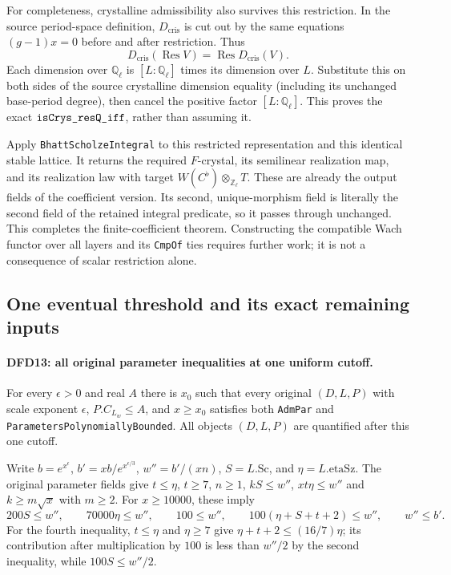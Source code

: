 \documentclass[11pt,a4paper]{article}
\numberwithin{equation}{section}
\theoremstyle{remark}\newtheorem{remark}[theorem]{Remark}
\begin{document}
For completeness, crystalline admissibility also survives
this restriction. In the source period-space definition,
$D_{\mathrm{cris}}$ is cut out by the same equations
$(g-1)x=0$ before and after restriction. Thus
\[
 D_{\mathrm{cris}}(\operatorname{Res}V)
   =\operatorname{Res}D_{\mathrm{cris}}(V).              \tag{DFD.19}
\]
Each dimension over $\mathbb Q_\ell$ is
$[L:\mathbb Q_\ell]$ times its dimension over $L$.
Substitute this on both sides of the source crystalline
dimension equality (including its unchanged base-period
degree), then cancel the positive factor
$[L:\mathbb Q_\ell]$. This proves the exact
$\texttt{is\allowbreak Crys\_\allowbreak res\allowbreak Q\_\allowbreak iff}$, rather than assuming it.

Apply \texttt{Bhatt\allowbreak Scholze\allowbreak Integral} to this restricted
representation and this identical stable lattice. It
returns the required $F$-crystal, its semilinear realization
map, and its realization law with target
$W(C^\flat)\otimes_{\mathbb Z_\ell}T$. These are already
the output fields of the coefficient version. Its second,
unique-morphism field is literally the second field of
the retained integral predicate, so it passes through
unchanged. This completes the finite-coefficient theorem.
Constructing the compatible Wach functor over all layers
and its \texttt{Cmp\allowbreak Of} ties requires further work; it is
not a consequence of scalar restriction alone.

\subsection{One eventual threshold and its exact remaining inputs}

\paragraph{DFD13: all original parameter inequalities at one uniform cutoff.}
\label{claim:DFD13}
For every $\epsilon>0$ and real $A$ there is $x_0$ such
that every original $(D,L,P)$ with scale exponent
$\epsilon$, $P.C_{L_w}\le A$, and $x\ge x_0$ satisfies
both \texttt{Adm\allowbreak Par} and
\texttt{Parameters\allowbreak Polynomially\allowbreak Bounded}. All objects
$(D,L,P)$ are quantified after this one cutoff.

Write $b=e^{x^\epsilon}$,
$b'=xb/e^{x^{\epsilon/3}}$,
$w''=b'/(xn)$, $S=L.\mathrm{Sc}$, and
$\eta=L.\mathrm{etaSz}$. The original parameter fields
give $t\le\eta$, $t\ge7$, $n\ge1$,
$kS\le w''$, $xt\eta\le w''$ and
$k\ge m\sqrt{x}$ with $m\ge2$.
For $x\ge10000$, these imply
\[
 200S\le w'',\qquad70000\eta\le w'',\qquad
 100\le w'',\qquad100(\eta+S+t+2)\le w'',
 \qquad w''\le b'.                                    \tag{DFD.20}
\]
For the fourth inequality, $t\le\eta$ and $\eta\ge7$
give $\eta+t+2\le(16/7)\eta$; its contribution after
multiplication by $100$ is less than $w''/2$ by the
second inequality, while $100S\le w''/2$.
\end{document}
